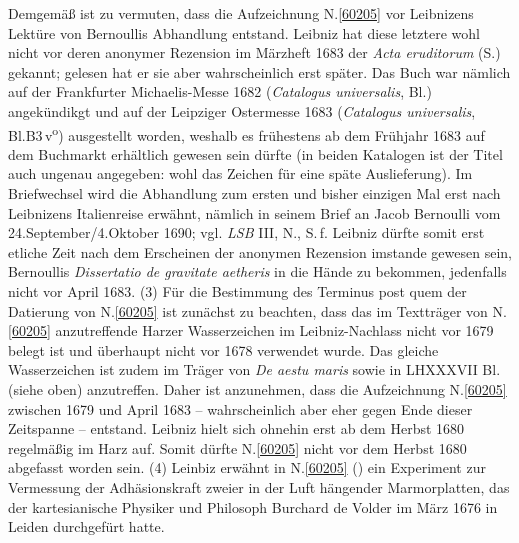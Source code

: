 Demgemäß ist zu vermuten, dass die Aufzeichnung N.\;\ref{60205} vor Leibnizens Lektüre von Bernoullis Abhandlung entstand.
Leibniz hat diese letztere wohl nicht vor deren anonymer Rezension\cite{01406} im Märzheft 1683 der \textit{Acta eruditorum}\cite{01023} (S.) gekannt; gelesen hat er sie aber wahrscheinlich erst später. %
Das Buch war nämlich auf der Frankfurter Michaelis-Messe 1682 (\textit{Catalogus universalis}, Bl.\;)\cite{02596} angekündikgt und auf der Leipziger Ostermesse 1683 (\textit{Catalogus universalis}, Bl.\;B3\,v\textsuperscript{o})\cite{02597} ausgestellt worden, weshalb es frühestens ab dem Frühjahr 1683 auf dem Buchmarkt erhältlich gewesen sein dürfte (in beiden Katalogen ist der Titel auch ungenau angegeben: wohl das Zeichen für eine späte Auslieferung).
Im Briefwechsel wird die Abhandlung zum ersten und bisher einzigen Mal erst nach Leibnizens Italienreise erwähnt, nämlich in seinem Brief an Jacob Bernoulli vom 24.\;September/4.\;Oktober 1690; vgl. \textit{LSB} III, N., S.\,f.\cite{01260} %
Leibniz dürfte somit erst etliche Zeit nach dem Erscheinen der anonymen Rezension\cite{01406} %
imstande gewesen sein, Bernoullis \textit{Dissertatio de gravitate aetheris}\cite{01403} in die Hände zu bekommen, jedenfalls nicht vor April 1683.
\pend%
\pstart%
(3)
Für die Bestimmung des Terminus post quem der Datierung von N.\;\ref{60205} ist zunächst zu beachten, dass das im Textträger von N.\;\ref{60205} anzutreffende Harzer Wasserzeichen im Leibniz-Nachlass nicht vor 1679 belegt ist und überhaupt nicht vor 1678 verwendet wurde. %
Das gleiche Wasserzeichen ist zudem im Träger von \textit{De aestu maris} sowie in LH\;XXXVII Bl. (siehe oben) anzutreffen.
Daher ist anzunehmen, dass die Aufzeichnung N.\;\ref{60205} zwischen 1679 und April 1683 -- wahrscheinlich aber eher gegen Ende dieser Zeitspanne -- entstand.
Leibniz hielt sich ohnehin erst ab dem Herbst 1680 regelmäßig im Harz auf.
Somit dürfte N.\;\ref{60205} nicht vor dem Herbst 1680 abgefasst worden sein.
\pend%
\pstart%
(4)
Leinbiz erwähnt in N.\;\ref{60205} () ein Experiment zur Vermessung der Adhäsionskraft zweier in der Luft hängender Marmorplatten, das der kartesianische Physiker und Philosoph Burchard de Volder im März 1676 in Leiden durchgefürt hatte.
